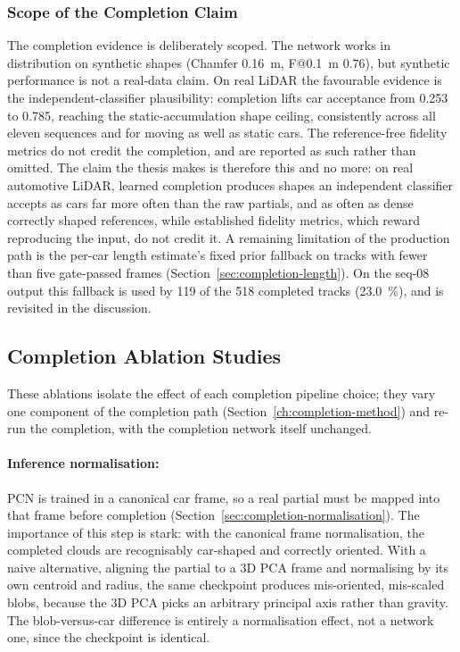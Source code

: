 \subsubsection{Scope of the Completion Claim}
\label{sec:results-completion-scope}

The completion evidence is deliberately scoped. The network works in distribution on
synthetic shapes (Chamfer \SI{0.16}{\meter}, F@\SI{0.1}{\meter} \num{0.76}), but synthetic
performance is not a real-data claim. On real LiDAR the favourable evidence is the
independent-classifier plausibility: completion lifts car acceptance from \num{0.253} to
\num{0.785}, reaching the static-accumulation shape ceiling, consistently across all eleven
sequences and for moving as well as static cars. The reference-free fidelity metrics do not
credit the completion, and are reported as such rather than omitted. The claim the thesis
makes is therefore this and no more: on real automotive LiDAR, learned completion produces
shapes an independent classifier accepts as cars far more often than the raw partials, and as
often as dense correctly shaped references, while established fidelity metrics, which reward
reproducing the input, do not credit it. A remaining limitation of the production path is the
per-car length estimate's fixed prior fallback on tracks with fewer than five gate-passed
frames (Section~\ref{sec:completion-length}). On the seq-08 output this fallback is used by
\num{119} of the \num{518} completed tracks (\SI{23.0}{\percent}), and is revisited in the discussion.

\subsection{Completion Ablation Studies}
\label{sec:abl-completion}

These ablations isolate the effect of each completion pipeline choice; they vary one
component of the completion path (Section~\ref{ch:completion-method}) and re-run the
completion, with the completion network itself unchanged.

\paragraph{Inference normalisation:} PCN is trained in a canonical car frame, so a real
partial must be mapped into that frame before completion
(Section~\ref{sec:completion-normalisation}). The importance of this step is stark: with the
canonical frame normalisation, the completed clouds are recognisably car-shaped and
correctly oriented. With a naive alternative, aligning the partial to a 3D PCA frame and
normalising by its own centroid and radius, the same checkpoint produces mis-oriented,
mis-scaled blobs, because the 3D PCA picks an arbitrary principal axis rather than gravity.
The blob-versus-car difference is entirely a normalisation effect, not a network one, since
the checkpoint is identical.

